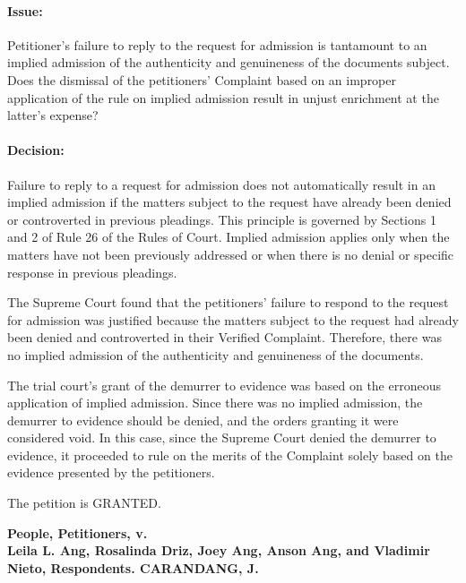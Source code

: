 \documentclass[
12pt,
oneside,
onehalfspacing,
headsepline
]{DigestCollection}
\begin{document}
\paragraph{Issue:}
\label{0bf73bf0-09fe-11ef-932c-63c852f65e48}


Petitioner's failure to reply to the request for admission is tantamount to an implied admission of the authenticity and genuineness of the documents subject. Does the dismissal of the petitioners' Complaint based on an improper application of the rule on implied admission result in unjust enrichment at the latter's expense?

\paragraph{Decision:}
\label{0e6a5ed0-09fe-11ef-932c-63c852f65e48}


Failure to reply to a request for admission does not automatically result in an implied admission if the matters subject to the request have already been denied or controverted in previous pleadings. This principle is governed by Sections 1 and 2 of Rule 26 of the Rules of Court. Implied admission applies only when the matters have not been previously addressed or when there is no denial or specific response in previous pleadings.

The Supreme Court found that the petitioners' failure to respond to the request for admission was justified because the matters subject to the request had already been denied and controverted in their Verified Complaint. Therefore, there was no implied admission of the authenticity and genuineness of the documents. 

The trial court's grant of the demurrer to evidence was based on the erroneous application of implied admission. Since there was no implied admission, the demurrer to evidence should be denied, and the orders granting it were considered void. In this case, since the Supreme Court denied the demurrer to evidence, it proceeded to rule on the merits of the Complaint solely based on the evidence presented by the petitioners. 

The petition is GRANTED.

\label{2e4dcd60-0a10-11ef-932c-63c852f65e48}


\noindent\textbf{People, Petitioners, v. \\Leila L. Ang, Rosalinda Driz, Joey Ang, Anson Ang, and Vladimir Nieto, Respondents. CARANDANG, J.}\vspace{0.4cm}
\end{document}
